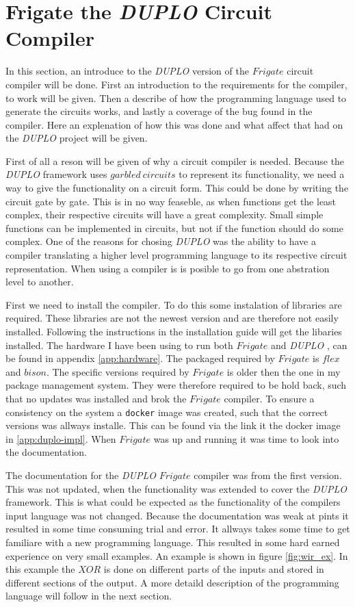 \documentclass[twoside,11pt,openright]{report}
\newcommand{\DUPLO}{\textit{DUPLO} }
\begin{document}
\section{Frigate the \DUPLO Circuit Compiler}
\label{sec:frigate}
In this section, an introduce to the \DUPLO version of the $Frigate$ circuit compiler will be done. First an introduction to the requirements for the compiler, to work will be given. Then a describe of how the programming language used to generate the circuits works, and lastly a coverage of the bug found in the compiler. Here an explenation of how this was done and what affect that had on the \DUPLO project will be given.

First of all a reson will be given of why a circuit compiler is needed. Because the \DUPLO framework uses $garbled~circuits$ to represent its functionality, we need a way to give the functionality on a circuit form. This could be done by writing the circuit gate by gate. This is in no way feaseble, as when functions get the least complex, their respective circuits will have a great complexity. Small simple functions can be implemented in circuits, but not if the function should do some complex. One of the reasons for chosing \DUPLO was the ability to have a compiler translating a higher level programming language to its respective circuit representation. When using a compiler is is posible to go from one abstration level to another.

First we need to install the compiler. To do this some instalation of libraries are required. These libraries are not the newest version and are therefore not easily installed. Following the instructions in the installation guide will get the libaries installed. The hardware I have been using to run both $Frigate$ and \DUPLO, can be found in appendix \ref{app:hardware}. The packaged required by $Frigate$ is $flex$ and $bison$. The specific versions required by $Frigate$ is older then the one in my package management system. They were therefore required to be hold back, such that no updates was installed and brok the $Frigate$ compiler. To ensure a consistency on the system a \verb|docker| image was created, such that the correct versions was allways installe. This can be found via the link it the docker image in \ref{app:duplo-impl}. When $Frigate$ was up and running it was time to look into the documentation.

The documentation for the \DUPLO $Frigate$ compiler was from the first version. This was not updated, when the functionality was extended to cover the \DUPLO framework. This is what could be expected as the functionality of the compilers input language was not changed. Because the documentation was weak at pints it resulted in some time consuming trial and error. It allways takes some time to get familiare with a new programming language. This resulted in some hard earned experience on very small examples. An example is shown in figure \ref{fig:wir_ex}. In this example the $XOR$ is done on different parts of the inputs and stored in different sections of the output. A more detaild description of the programming language will follow in the next section.
\end{document}
